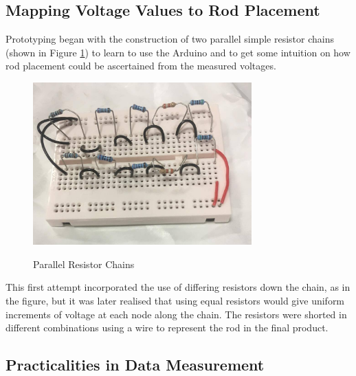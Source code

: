 \subsection{Mapping Voltage Values to Rod Placement}
Prototyping began with the construction of two parallel simple resistor chains (shown in Figure \ref{fig:simple_resistor}) to learn to use the Arduino and to get some intuition on how rod placement could be ascertained from the measured voltages. 

\begin{figure}[H]
	\begin{center}
	\includegraphics[width=0.75\textwidth]{simple_resistor_chain.jpg}\\
  	\caption{Parallel Resistor Chains}
    \label{fig:simple_resistor}
    \end{center}
\end{figure}

This first attempt incorporated the use of differing resistors down the chain, as in the figure, but it was later realised that using equal resistors would give uniform increments of voltage at each node along the chain. The resistors were shorted in different combinations using a wire to represent the rod in the final product.



\subsection{Practicalities in Data Measurement}



